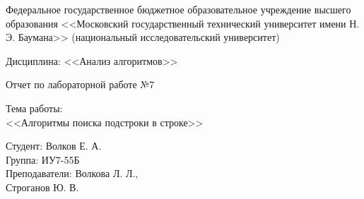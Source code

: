 \documentclass[a4paper,12pt]{article}
\begin{document}


\large
\begin{center}
Федеральное государственное бюджетное образовательное учреждение 
высшего образования <<Московский государственный технический 
университет имени Н. Э. Баумана>> 
(национальный исследовательский университет)
\end{center}

\vspace*{30mm} 

\LARGE
\begin{center}
Дисциплина: <<Анализ алгоритмов>>

Отчет по лабораторной работе №7
\end{center}

\vspace*{30mm} 

\huge
\begin{center}
Тема работы:\\
<<Алгоритмы поиска подстроки в строке>>
\end{center}
\vspace*{30mm} 

\large
\begin{flushright}
Студент: Волков Е. А. \\
Группа: ИУ7-55Б \\
Преподаватели: Волкова Л. Л., \\ Строганов Ю. В. \\
\end{flushright}
\end{document}
